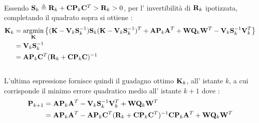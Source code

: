 \\
Essendo $\mathbf{S}_k \triangleq \mathbf{R}_k+\mathbf{C}\mathbf{P}_k\mathbf{C}^T > \mathbf{R}_k > 0 $, per l' invertibilità di $\mathbf{R}_k$ ipotizzata, completando il quadrato sopra si ottiene : 
\begin{align}
\mathbf{K}_k &= \underset{\mathbf{K}}{\operatorname{argmin}} \left\{(\mathbf{K}-\mathbf{V}_k\mathbf{S}^{-1}_k)\mathbf{S}_k(\mathbf{K}-\mathbf{V}_k\mathbf{S}^{-1}_k)^T + \mathbf{A}\mathbf{P}_k\mathbf{A}^T+\mathbf{W}\mathbf{Q}_k\mathbf{W}^T-\mathbf{V}_k\mathbf{S}^{-1}_k\mathbf{V}^T_k\right\}\nonumber\\ 
&= \mathbf{V}_k\mathbf{S}^{-1}_k \nonumber\\
&= \mathbf{A}\mathbf{P}_k\mathbf{C}^T(\mathbf{R}_k+\mathbf{C}\mathbf{P}_k\mathbf{C})^{-1} \nonumber
\end{align}
\\
L'ultima espressione fornisce quindi il guadagno ottimo $\mathbf{K}_k$, all' istante $k$, a cui corrisponde il minimo errore quadratico medio all' istante $k+1$ dove :
\begin{align}
\mathbf{P}_{k+1}&=\mathbf{A}\mathbf{P}_k\mathbf{A}^T-\mathbf{V}_k\mathbf{S}^{-1}_k\mathbf{V}^T_k+\mathbf{W}\mathbf{Q}_k\mathbf{W}^T\nonumber\\ 
&=\mathbf{A}\mathbf{P}_k\mathbf{A}^T-\mathbf{A}\mathbf{P}_k\mathbf{C}^T(\mathbf{R}_k+\mathbf{C}\mathbf{P}_k\mathbf{C}^T)^{-1}\mathbf{C}\mathbf{P}_k\mathbf{A}^T+\mathbf{W}\mathbf{Q}_k\mathbf{W}^T \nonumber
\end{align}
\newpage